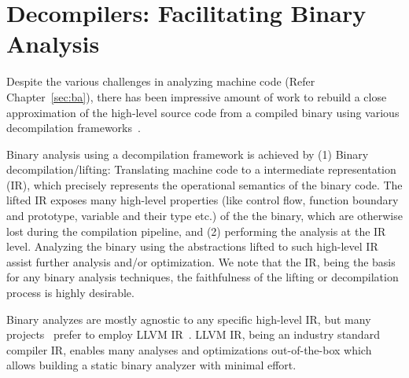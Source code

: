 \chapter{Decompilers: Facilitating Binary Analysis}\label{sec:decompilers}

Despite the various challenges in analyzing machine code (Refer
    Chapter~\ref{sec:ba}), there has been impressive amount of work to rebuild
a close approximation of the high-level source code from a compiled binary
using various decompilation
frameworks~\cite{McSema:Recon14,Remill,Angr1,BAP:CAV11,Radare2,FCD,BitBlaze:2008,hexray,Fokin:2011,eschulte2018bed,katz2018rnn,Schwartz:2013,IDA,mctoll,revgen}.

Binary analysis using a decompilation framework is achieved by (1) Binary
decompilation/lifting: Translating machine code to a intermediate
representation (IR), which precisely represents the operational semantics of
the binary code. The lifted IR exposes many high-level properties (like control
    flow, function boundary and prototype, variable and their type etc.) of the
the binary, which are otherwise lost during the compilation pipeline, and (2)
  performing the analysis at the IR level.  Analyzing the binary using the
  abstractions lifted to such high-level IR assist further analysis and/or
  optimization. We note that the IR, being the basis for any binary analysis
  techniques, the faithfulness of the lifting or decompilation process is
  highly desirable. 

Binary analyzes are mostly agnostic to any specific high-level IR, but many
projects~\cite{McSema:Recon14,Remill,FCD,reopt,mctoll} prefer to employ LLVM
IR~\cite{Lattner:2004}. LLVM IR, being an industry standard compiler IR,
  enables many analyses and optimizations out-of-the-box which allows building
  a static binary analyzer with minimal effort.
